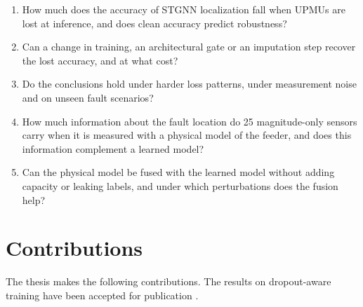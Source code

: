 \documentclass[MTech]{ugthesis}
\begin{document}
\begin{enumerate}
\item[RQ1.] How much does the accuracy of \ac{STGNN} localization fall when \acp{UPMU} are lost at inference, and does clean accuracy predict robustness?
\item[RQ2.] Can a change in training, an architectural gate or an imputation step recover the lost accuracy, and at what cost?
\item[RQ3.] Do the conclusions hold under harder loss patterns, under measurement noise and on unseen fault scenarios?
\item[RQ4.] How much information about the fault location do 25 magnitude-only sensors carry when it is measured with a physical model of the feeder, and does this information complement a learned model?
\item[RQ5.] Can the physical model be fused with the learned model without adding capacity or leaking labels, and under which perturbations does the fusion help?
\end{enumerate}

\section{Contributions}

The thesis makes the following contributions. The results on dropout-aware training have been accepted for publication \citep{sangameswar2026}.
\end{document}

